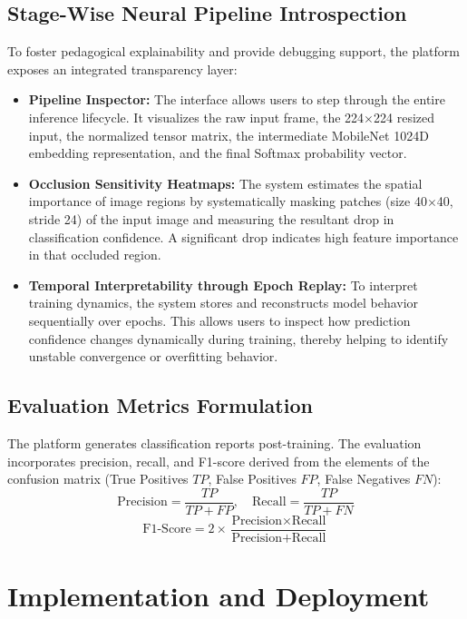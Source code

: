 \documentclass[conference]{IEEEtran}
\begin{document}
\subsection{Stage-Wise Neural Pipeline Introspection}
To foster pedagogical explainability and provide debugging support, the platform exposes an integrated transparency layer:
\begin{itemize}
    \item \textbf{Pipeline Inspector:} The interface allows users to step through the entire inference lifecycle. It visualizes the raw input frame, the 224$\times$224 resized input, the normalized tensor matrix, the intermediate MobileNet 1024D embedding representation, and the final Softmax probability vector.
    \item \textbf{Occlusion Sensitivity Heatmaps:} The system estimates the spatial importance of image regions by systematically masking patches (size 40$\times$40, stride 24) of the input image and measuring the resultant drop in classification confidence. A significant drop indicates high feature importance in that occluded region.
    \item \textbf{Temporal Interpretability through Epoch Replay:} To interpret training dynamics, the system stores and reconstructs model behavior sequentially over epochs. This allows users to inspect how prediction confidence changes dynamically during training, thereby helping to identify unstable convergence or overfitting behavior.
\end{itemize}

\subsection{Evaluation Metrics Formulation}
The platform generates classification reports post-training. The evaluation incorporates precision, recall, and F1-score derived from the elements of the confusion matrix (True Positives $TP$, False Positives $FP$, False Negatives $FN$):
\begin{equation}
\text{Precision} = \frac{TP}{TP + FP}, \quad \text{Recall} = \frac{TP}{TP + FN}
\end{equation}
\begin{equation}
\text{F1-Score} = 2 \times \frac{\text{Precision} \times \text{Recall}}{\text{Precision} + \text{Recall}}
\end{equation}

\section{Implementation and Deployment}
\end{document}
